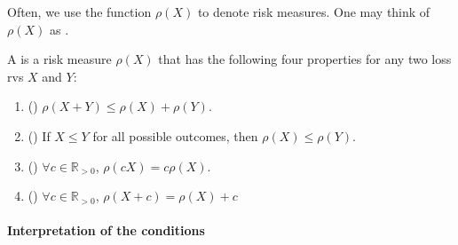 \documentclass[notoc,notitlepage]{tufte-book}
\begin{document}
Often, we use the function $\rho(X)$ to denote risk measures. One may think of $\rho(X)$ as .

\begin{defn}\label{defn:coherent_risk_measure}
  A  is a risk measure $\rho(X)$ that has the following four properties for any two loss rvs $X$ and $Y$:
  \begin{enumerate}
    \item () $\rho(X + Y) \leq \rho(X) + \rho(Y)$.
    \item () If $X \leq Y$ for all possible outcomes, then $\rho(X) \leq \rho(Y)$.
    \item () $\forall c \in \mathbb{R}_{> 0}$, $\rho(cX) = c\rho(X)$.
    \item () $\forall c \in \mathbb{R}_{> 0}$, $\rho(X + c) = \rho(X) + c$
  \end{enumerate}
\end{defn}

\paragraph{Interpretation of the conditions}
\end{document}
